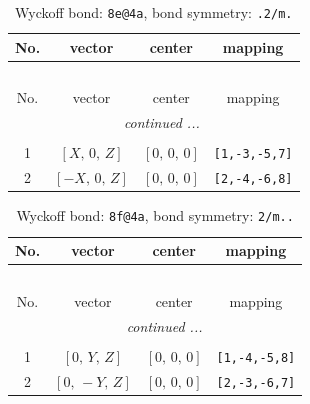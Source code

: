 \documentclass[fleqn,8pt]{jsarticle}
\begin{document}
\begin{longtable}{cccc}
\caption{Wyckoff bond: {\tt 8e@4a}, bond symmetry: {\tt .2/m.}}
 \\
 \hline \hline
No. & vector & center & mapping \\ \hline \endfirsthead

\multicolumn{3}{l}{\tablename\ \thetable{}} \\
 \hline \hline
No. & vector & center & mapping \\ \hline \endhead

 \hline \hline
\multicolumn{3}{r}{\footnotesize\it continued ...} \\ \endfoot

 \hline \hline
\multicolumn{3}{r}{} \\ \endlastfoot

1 & $\left[ X,\, 0,\, Z \right]$ & $\left[ 0,\, 0,\, 0 \right]$ & {\tt [1,-3,-5,7]} \\ \hline
2 & $\left[ - X,\, 0,\, Z \right]$ & $\left[ 0,\, 0,\, 0 \right]$ & {\tt [2,-4,-6,8]} \\
\end{longtable}
\renewcommand{\arraystretch}{1.2}
\begin{longtable}{cccc}
\caption{Wyckoff bond: {\tt 8f@4a}, bond symmetry: {\tt 2/m..}}
 \\
 \hline \hline
No. & vector & center & mapping \\ \hline \endfirsthead

\multicolumn{3}{l}{\tablename\ \thetable{}} \\
 \hline \hline
No. & vector & center & mapping \\ \hline \endhead

 \hline \hline
\multicolumn{3}{r}{\footnotesize\it continued ...} \\ \endfoot

 \hline \hline
\multicolumn{3}{r}{} \\ \endlastfoot

1 & $\left[ 0,\, Y,\, Z \right]$ & $\left[ 0,\, 0,\, 0 \right]$ & {\tt [1,-4,-5,8]} \\ \hline
2 & $\left[ 0,\, - Y,\, Z \right]$ & $\left[ 0,\, 0,\, 0 \right]$ & {\tt [2,-3,-6,7]} \\
\end{longtable}
\renewcommand{\arraystretch}{1.2}
\end{document}
